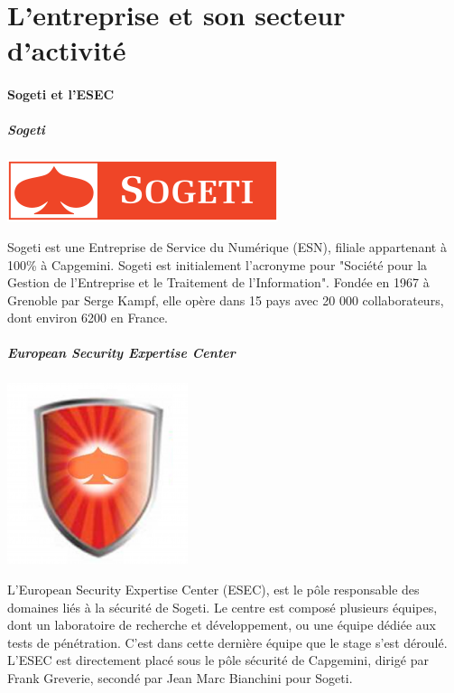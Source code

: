 \section*{L'entreprise et son secteur d'activité}
\paragraph{Sogeti et l'ESEC}
\subparagraph{Sogeti}
\begin{center}
\includegraphics[scale=0.7]{sogeti.png}
\end{center}
Sogeti est une Entreprise de Service du Numérique (ESN), filiale appartenant
à 100\% à Capgemini. Sogeti est initialement l'acronyme pour "Société pour la Gestion de
l'Entreprise et le Traitement de l'Information". Fondée en 1967 à Grenoble par Serge Kampf, elle opère
dans 15 pays avec 20 000 collaborateurs, dont environ 6200 en France.
\paragraph{}
\paragraph{}

\subparagraph{European Security Expertise Center}
\begin{center}
\includegraphics[scale=0.4]{esec.png}
\end{center}
L'European Security Expertise Center (ESEC), est le pôle responsable des domaines
liés à la sécurité de Sogeti. Le centre est composé plusieurs équipes, dont un
laboratoire de recherche et développement, ou une équipe dédiée aux tests de pénétration.
C'est dans cette dernière équipe que le stage s'est déroulé.
L'ESEC est directement placé sous le pôle sécurité de Capgemini, dirigé par Frank
Greverie, secondé par Jean Marc Bianchini pour Sogeti.

